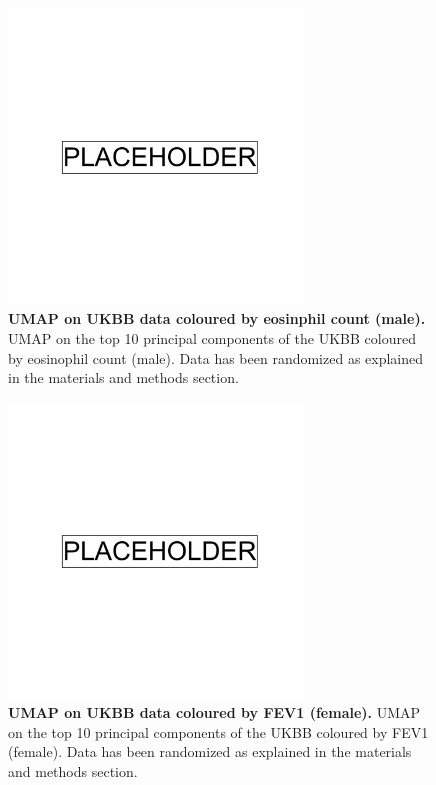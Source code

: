 \newpage

\begin{figure}
    \centering
    \includegraphics[width=0.7\textwidth]{placeholder.png}
    \caption[UMAP on UKBB data coloured by eosinphil count (male)]{\textbf{UMAP on UKBB data coloured by eosinphil count (male).} UMAP on the top 10 principal components of the UKBB coloured by eosinophil count (male). Data has been randomized as explained in the materials and methods section.}
    \label{fig:supp_ukbb_eosinophill_m}
\end{figure}

\newpage

\begin{figure}
    \centering
    \includegraphics[width=0.7\textwidth]{placeholder.png}
    \caption[UMAP on UKBB data coloured by FEV1 (female)]{\textbf{UMAP on UKBB data coloured by FEV1 (female).} UMAP on the top 10 principal components of the UKBB coloured by FEV1 (female). Data has been randomized as explained in the materials and methods section.}
    \label{fig:supp_ukbb_fev_f}
\end{figure}

